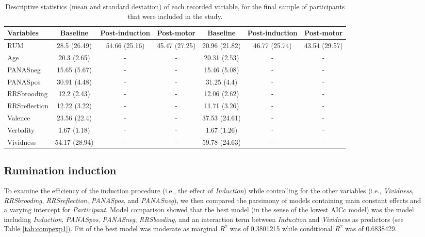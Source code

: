 \documentclass[12pt,]{book}
\begin{document}
\begin{table}

\caption{\label{tab:sumstat}Descriptive statistics (mean and standard deviation) of each recorded variable, for the final sample of participants that were included in the study.}
\centering
\begin{tabular}[t]{l|c|c|c|c|c|c}
\hline
Variables & Baseline & Post-induction & Post-motor & Baseline & Post-induction & Post-motor\\
\hline
RUM & 28.5 (26.49) & 54.66 (25.16) & 45.47 (27.25) & 20.96 (21.82) & 46.77 (25.74) & 43.54 (29.57)\\
\hline
Age & 20.3 (2.65) & - & - & 20.31 (2.53) & - & -\\
\hline
PANASneg & 15.65 (5.67) & - & - & 15.46 (5.08) & - & -\\
\hline
PANASpos & 30.91 (4.48) & - & - & 31.25 (4.4) & - & -\\
\hline
RRSbrooding & 12.2 (2.43) & - & - & 12.06 (2.62) & - & -\\
\hline
RRSreflection & 12.22 (3.22) & - & - & 11.71 (3.26) & - & -\\
\hline
Valence & 23.56 (22.4) & - & - & 37.53 (24.61) & - & -\\
\hline
Verbality & 1.67 (1.18) & - & - & 1.67 (1.26) & - & -\\
\hline
Vividness & 54.17 (28.94) & - & - & 59.78 (24.63) & - & -\\
\hline
\end{tabular}
\end{table}

\subsection{Rumination induction}\label{rumination-induction-2}

To examine the efficiency of the induction procedure (i.e., the effect
of \emph{Induction}) while controlling for the other variables (i.e.,
\emph{Vividness}, \emph{RRSbrooding}, \emph{RRSreflection},
\emph{PANASpos}, and \emph{PANASneg}), we then compared the parsimony of
models containing main constant effects and a varying intercept for
\emph{Participant}. Model comparison showed that the best model (in the
sense of the lowest AICc model) was the model including
\emph{Induction}, \emph{PANASpos}, \emph{PANASneg}, \emph{RRSbooding},
and an interaction term between \emph{Induction} and \emph{Vividness} as
predictors (see Table \ref{tab:compexp1}). Fit of the best model was
moderate as marginal \(R^{2}\) was of 0.3801215 while conditional
\(R^{2}\) was of 0.6838429.
\end{document}
